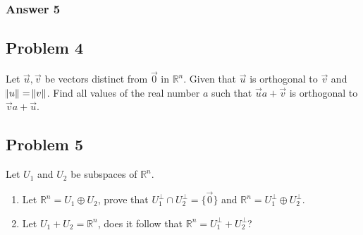 \documentclass[fleqn]{article}
\begin{document}
\subsubsection{Answer 5}
\label{sec-1-3-1}
\subsection{Problem 4}
\label{sec-1-4}
Let $\vec{u}, \vec{v}$ be vectors distinct from $\vec{0}$ in $\mathbb{R}^n$.
Given that $\vec{u}$ is orthogonal to $\vec{v}$ and $\norm{u}=\norm{v}$.
Find all values of the real number $a$ such that $\vec{u}a+\vec{v}$ is
orthogonal to $\vec{v}a+\vec{u}$.
\subsection{Problem 5}
\label{sec-1-5}
Let $U_1$ and $U_2$ be subspaces of $\mathbb{R}^n$.
\begin{enumerate}
\item Let $\mathbb{R}^n=U_1\oplus U_2$, prove that 
      $U_1^{\bot}\cap U_2^{\bot}=\{\vec{0}\}$ and 
      $\mathbb{R}^n=U_1^{\bot}\oplus U_2^{\bot}$.
\item Let $U_1+U_2=\mathbb{R}^n$, does it follow that 
      $\mathbb{R}^n=U_1^{\bot}+U_2^{\bot}$?
\end{enumerate}
\end{document}

